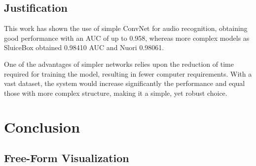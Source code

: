 \documentclass[]{article}
\begin{document}
\subsection{Justification}\label{justification}

This work has shown the use of simple ConvNet for audio recognition, obtaining good performance with an AUC of up to 0.958, whereas more complex models as SluiceBox obtained 0.98410 AUC and Nuori 0.98061. 

One of the advantages of simpler networks relies upon the reduction of time required for training the model, resulting in fewer computer requirements. With a vast dataset, the system would increase significantly the performance and equal those with more complex structure, making it a simple, yet robust choice. %


\section{Conclusion}\label{v.-conclusion}


\subsection{Free-Form Visualization}\label{free-form-visualization}
\end{document}
